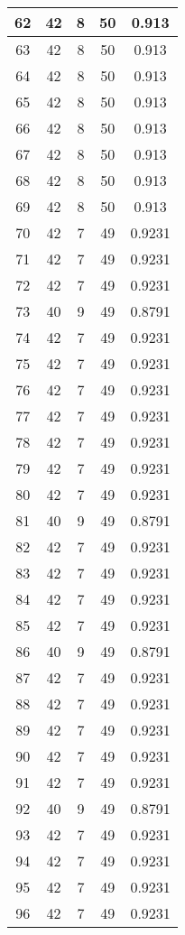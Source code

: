 \documentclass[letterpaper, 12pt]{article}
\begin{document}
\begin{longtable}{|c|c|c|c|c|}
\hline
62 & 42 & 8 & 50 & 0.913 \\
\hline
63 & 42 & 8 & 50 & 0.913 \\
\hline
64 & 42 & 8 & 50 & 0.913 \\
\hline
65 & 42 & 8 & 50 & 0.913 \\
\hline
66 & 42 & 8 & 50 & 0.913 \\
\hline
67 & 42 & 8 & 50 & 0.913 \\
\hline
68 & 42 & 8 & 50 & 0.913 \\
\hline
69 & 42 & 8 & 50 & 0.913 \\
\hline
70 & 42 & 7 & 49 & 0.9231 \\
\hline
71 & 42 & 7 & 49 & 0.9231 \\
\hline
72 & 42 & 7 & 49 & 0.9231 \\
\hline
73 & 40 & 9 & 49 & 0.8791 \\
\hline
74 & 42 & 7 & 49 & 0.9231 \\
\hline
75 & 42 & 7 & 49 & 0.9231 \\
\hline
76 & 42 & 7 & 49 & 0.9231 \\
\hline
77 & 42 & 7 & 49 & 0.9231 \\
\hline
78 & 42 & 7 & 49 & 0.9231 \\
\hline
79 & 42 & 7 & 49 & 0.9231 \\
\hline
80 & 42 & 7 & 49 & 0.9231 \\
\hline
81 & 40 & 9 & 49 & 0.8791 \\
\hline
82 & 42 & 7 & 49 & 0.9231 \\
\hline
83 & 42 & 7 & 49 & 0.9231 \\
\hline
84 & 42 & 7 & 49 & 0.9231 \\
\hline
85 & 42 & 7 & 49 & 0.9231 \\
\hline
86 & 40 & 9 & 49 & 0.8791 \\
\hline
87 & 42 & 7 & 49 & 0.9231 \\
\hline
88 & 42 & 7 & 49 & 0.9231 \\
\hline
89 & 42 & 7 & 49 & 0.9231 \\
\hline
90 & 42 & 7 & 49 & 0.9231 \\
\hline
91 & 42 & 7 & 49 & 0.9231 \\
\hline
92 & 40 & 9 & 49 & 0.8791 \\
\hline
93 & 42 & 7 & 49 & 0.9231 \\
\hline
94 & 42 & 7 & 49 & 0.9231 \\
\hline
95 & 42 & 7 & 49 & 0.9231 \\
\hline
96 & 42 & 7 & 49 & 0.9231 \\

\end{longtable}
\end{document}
